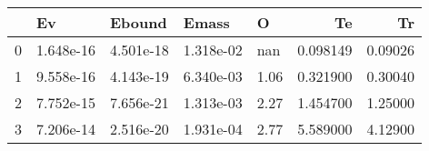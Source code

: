 \begin{tabular}{lllllrr}
\toprule
{} &         Ev &     Ebound &      Emass &     O &        Te &       Tr \\
\midrule
0 &  1.648e-16 &  4.501e-18 &  1.318e-02 &   nan &  0.098149 &  0.09026 \\
1 &  9.558e-16 &  4.143e-19 &  6.340e-03 &  1.06 &  0.321900 &  0.30040 \\
2 &  7.752e-15 &  7.656e-21 &  1.313e-03 &  2.27 &  1.454700 &  1.25000 \\
3 &  7.206e-14 &  2.516e-20 &  1.931e-04 &  2.77 &  5.589000 &  4.12900 \\
\bottomrule
\end{tabular}
